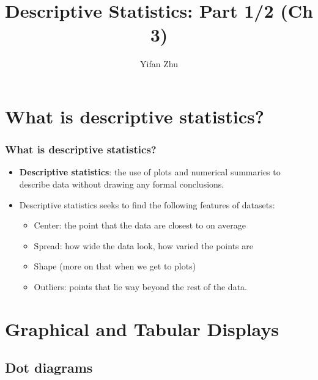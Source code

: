 \documentclass[handout]{beamer}
\title{Descriptive Statistics: Part 1/2 (Ch 3)}
\author{Yifan Zhu}
\date{}
\institute{Iowa State University}
\numberwithin{equation}{section}
\begin{document}


\begin{frame}
\titlepage
 \end{frame}
 

\section{What is descriptive statistics?}

\begin{frame}
\frametitle{What is descriptive statistics?}

\begin{itemize}
\pause \item {\bf Descriptive statistics}: the use of plots and numerical summaries to describe data without drawing any formal conclusions.
\pause \item Descriptive statistics seeks to find the following features of datasets:
\begin{itemize}
\pause \item Center: the point that the data are closest to on average
\pause \item Spread: how wide the data look, how varied the points are
\pause \item Shape (more on that when we get to plots)
\pause \item Outliers: points that lie way beyond the rest of the data.
\end{itemize}
\end{itemize}

\end{frame}


\section{Graphical and Tabular Displays}

\subsection{Dot diagrams}
\end{document}
